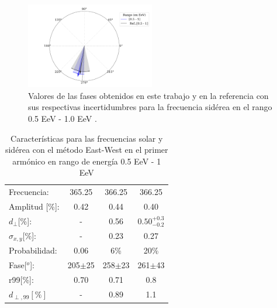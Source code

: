 \begin{figure}[H]
    \begin{small}
        \begin{center}
            \includegraphics[width=0.5\textwidth]{phase_segundo_bin.pdf}
        \end{center}
        \caption{Valores de las fases obtenidos en este trabajo y en la referencia con sus respectivas incertidumbres para la frecuencia sidérea en el  rango 0.5 EeV - 1.0 EeV .}
        \label{fig:segundo}
    \end{small}
\end{figure}

\begin{table}[H]
        \begin{small}
            \begin{center}
                \begin{tabular}[c]{l|c||c|c}
                    Frecuencia:         & 365.25	    & 366.25		& 366.25\cite{Aab_2020}\\
                    Amplitud [\%]:      & 0.42          & 0.44	        & 0.40\footnotemark[2] \\
                    $d_\perp$[\%]:      & -             & 0.56          & $0.50^{+0.3}_{-0.2}$\\
                    $\sigma_{x,y}$[\%]: & -	            & 0.23	        & 0.27       \\
                    Probabilidad:       & 0.06          & 6\%	        & 20\%\\
                    Fase[$^o$]:         & 205$\pm$25	& 258$\pm$23	& 261$\pm$43\footnotemark[3]  \\
                    r99[\%]:            & 0.70	        & 0.71          & 0.8\footnotemark[2] \\
                    $d_{\perp,99}[\%]$  & -             & 0.89          & 1.1\\
                \end{tabular}
            \end{center}
        \end{small}
        \caption{Características para las frecuencias solar y sidérea con el método East-West en el primer armónico en rango de energía 0.5 EeV - 1 EeV}
        \label{tab:solar}
    \end{table}

